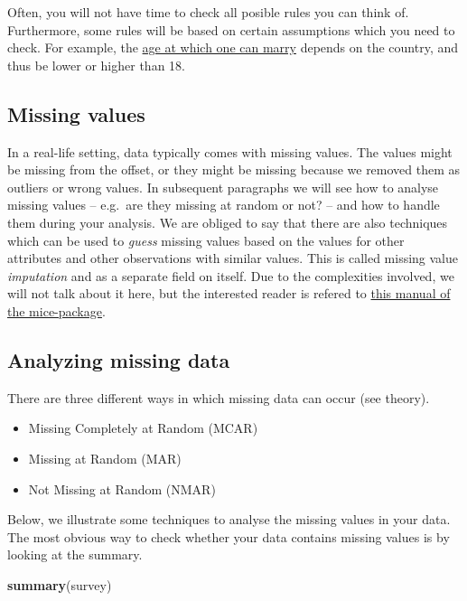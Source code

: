 \documentclass[]{tufte-book}
\newenvironment{Shaded}{}{}
\newcommand{\KeywordTok}[1]{\textcolor[rgb]{0.00,0.44,0.13}{\textbf{#1}}}
\newcommand{\NormalTok}[1]{#1}
\providecommand{\tightlist}{%
  \setlength{\itemsep}{0pt}\setlength{\parskip}{0pt}}
\begin{document}
Often, you will not have time to check all posible rules you can think of. Furthermore, some rules will be based on certain assumptions which you need to check. For example, the \href{https://en.wikipedia.org/wiki/Marriageable_age}{age at which one can marry} depends on the country, and thus be lower or higher than 18.

\hypertarget{missing-values}{%
\subsection{Missing values}\label{missing-values}}

In a real-life setting, data typically comes with missing values. The values might be missing from the offset, or they might be missing because we removed them as outliers or wrong values. In subsequent paragraphs we will see how to analyse missing values -- e.g.~are they missing at random or not? -- and how to handle them during your analysis. We are obliged to say that there are also techniques which can be used to \emph{guess} missing values based on the values for other attributes and other observations with similar values. This is called missing value \emph{imputation} and as a separate field on itself. Due to the complexities involved, we will not talk about it here, but the interested reader is refered to \href{https://datascienceplus.com/imputing-missing-data-with-r-mice-package/}{this manual of the mice-package}.

\hypertarget{analyzing-missing-data}{%
\subsection{Analyzing missing data}\label{analyzing-missing-data}}

There are three different ways in which missing data can occur (see theory).

\begin{itemize}
\tightlist
\item
  Missing Completely at Random (MCAR)
\item
  Missing at Random (MAR)
\item
  Not Missing at Random (NMAR)
\end{itemize}

Below, we illustrate some techniques to analyse the missing values in your data. The most obvious way to check whether your data contains missing values is by looking at the summary.

\begin{Shaded}
\begin{Highlighting}[]
\KeywordTok{summary}\NormalTok{(survey)}
\end{Highlighting}
\end{Shaded}
\end{document}
